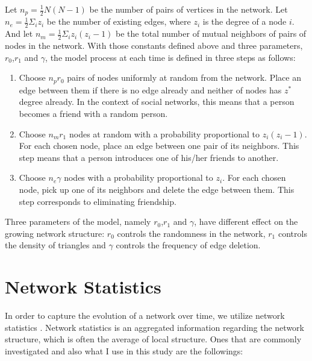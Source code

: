 \documentclass{article}
\begin{document}
Let $n_{p} = \frac{1}{2}N(N-1)$ be the number of pairs of vertices in the network. Let $n_{e} = \frac{1}{2}\Sigma_{i}z_{i}$ be the number of existing edges, where $z_{i}$ is the degree of a node $i$. And let $n_{m} = \frac{1}{2}\Sigma_{i}z_{i}(z_{i}-1)$ be the total number of mutual neighbors of pairs of nodes in the network. With those constants defined above and three parameters, $r_{0}$,$r_{1}$ and $\gamma$, the model process at each time is defined in three steps as follows:

\begin{enumerate}
\item Choose $n_{p}r_{0}$ pairs of nodes uniformly at random from the network. Place an edge between them if there is no edge already and neither of nodes has $z^*$ degree already. In the context of social networks, this means that a person becomes a friend with a random person.

\item Choose  $n_{m}r_{1}$ nodes at random with a probability proportional to $z_{i}(z_{i}-1)$. For each chosen node, place an edge between one pair of its neighbors. This step means that a person introduces one of his/her friends to another.

\item Choose $n_{e}\gamma$ nodes with a probability proportional to $z_{i}$. For each chosen node, pick up one of its neighbors and delete the edge between them. This step corresponds to eliminating friendship.
\end{enumerate}

Three parameters of the model, namely $r_{0}$,$r_{1}$ and $\gamma$, have different effect on the growing network structure: $r_{0}$ controls the randomness in the network, $r_{1}$ controls the density of triangles and $\gamma$ controls the frequency of edge deletion.

\section{Network Statistics}
 In order to capture the evolution of a network over time, we utilize network statistics \cite{Brandes:2005:NAM:1062400}. Network statistics is an aggregated information regarding the network structure, which is often the average of local structure. Ones that are commonly investigated and also what I use in this study are the followings:
 
\end{document}
